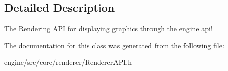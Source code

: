 \subsection{Detailed Description}
The Rendering A\+PI for displaying graphics through the engine api! 

The documentation for this class was generated from the following file\+:\begin{DoxyCompactItemize}
\item 
engine/src/core/renderer/Renderer\+A\+P\+I.\+h\end{DoxyCompactItemize}
